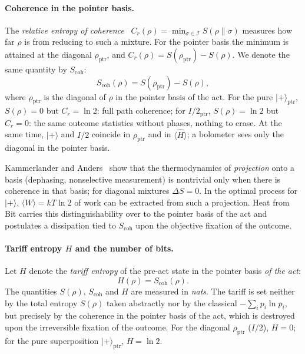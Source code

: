 \documentclass[11pt,a4paper]{article}
\begin{document}
\paragraph{Coherence in the pointer basis.}
The \emph{relative entropy of coherence}~\cite{baumgratz2014,streltsov2017} $C_r(\rho)=\min_{\sigma\in\mathcal{I}} S(\rho\|\sigma)$ measures how far $\rho$ is from reducing to such a mixture. For the pointer basis the minimum is attained at the diagonal $\rho_{\mathrm{ptr}}$, and $C_r(\rho)=S(\rho_{\mathrm{ptr}})-S(\rho)$. We denote the same quantity by $S_{\mathrm{coh}}$:
\begin{equation}
S_{\mathrm{coh}}(\rho) = S(\rho_{\mathrm{ptr}}) - S(\rho),
\end{equation}
where $\rho_{\mathrm{ptr}}$ is the diagonal of $\rho$ in the pointer basis of the act. For the pure $|{+}\rangle_{\mathrm{ptr}}$, $S(\rho)=0$ but $C_r=\ln 2$: full path coherence; for $I/2_{\mathrm{ptr}}$, $S(\rho)=\ln 2$ but $C_r=0$: the same outcome statistics without phases, nothing to erase. At the same time, $|{+}\rangle$ and $I/2$ coincide in $\rho_{\mathrm{ptr}}$ and in $\langle\hat{H}\rangle$; a bolometer sees only the diagonal in the pointer basis.

Kammerlander and Anders~\cite{kammerlander2016} show that the thermodynamics of \emph{projection} onto a basis (dephasing, nonselective measurement) is nontrivial only when there is coherence in that basis; for diagonal mixtures $\Delta S=0$. In the optimal process for $|{+}\rangle$, $\langle W\rangle=kT\ln 2$ of work can be extracted from such a projection. Heat from Bit carries this distinguishability over to the pointer basis of the act and postulates a dissipation tied to $S_{\mathrm{coh}}$ upon the objective fixation of the outcome.

\paragraph{Tariff entropy $H$ and the number of bits.}
Let $H$ denote the \emph{tariff entropy} of the pre-act state in the pointer basis \emph{of the act}:
\begin{equation}
H(\rho) = S_{\mathrm{coh}}(\rho).
\end{equation}
The quantities $S(\rho)$, $S_{\mathrm{coh}}$ and $H$ are measured in \emph{nats}. The tariff is set neither by the total entropy $S(\rho)$ taken abstractly nor by the classical $-\sum_i p_i\ln p_i$, but precisely by the coherence in the pointer basis of the act, which is destroyed upon the irreversible fixation of the outcome. For the diagonal $\rho_{\mathrm{ptr}}$ ($I/2$), $H=0$; for the pure superposition $|{+}\rangle_{\mathrm{ptr}}$, $H=\ln 2$.
\end{document}
